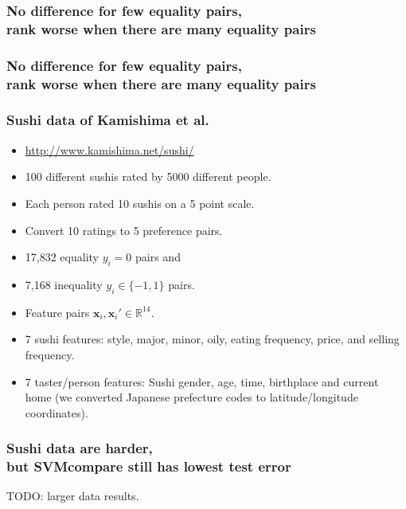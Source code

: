 \documentclass{beamer}
\newcommand{\RR}{\mathbb R}
\begin{document}


\begin{frame}
  \frametitle{No difference for few equality pairs,\\
    rank worse when there are many equality pairs}
  \begin{minipage}{1.0\linewidth}
    \hskip -0.5cm
      
  \end{minipage}
\end{frame}

\begin{frame}
  \frametitle{No difference for few equality pairs,\\
    rank worse when there are many equality pairs}
  \begin{minipage}{1.0\linewidth}
    \hskip -0.5cm
      
  \end{minipage}
\end{frame}

\begin{frame}
  \frametitle{Sushi data of Kamishima et al.}
  \begin{itemize}
  \item  \url{http://www.kamishima.net/sushi/}
  \item 100 different sushis rated by 5000 different people.
  \item Each person rated 10 sushis on a 5 point scale. 
  \item Convert 10 ratings to 5 preference pairs.
  \item 17,832 equality $y_i=0$ pairs and
  \item 7,168 inequality $y_i\in\{-1,1\}$ pairs.
  \item Feature pairs $\mathbf x_i,\mathbf x_i'\in\RR^{14}$.
  \item 7 sushi features: style, major, minor, oily, eating frequency,
    price, and selling frequency.
  \item 7 taster/person features: Sushi gender, age, time, birthplace
    and current home (we converted Japanese prefecture codes to
    latitude/longitude coordinates).
  \end{itemize}
\end{frame}

\begin{frame}
  \frametitle{Sushi data are harder,\\
    but SVMcompare still has lowest test error}
TODO: larger data results.
  \begin{minipage}{1.0\linewidth}
    \hskip -1cm
      
  \end{minipage}
\end{frame}
\end{document}
